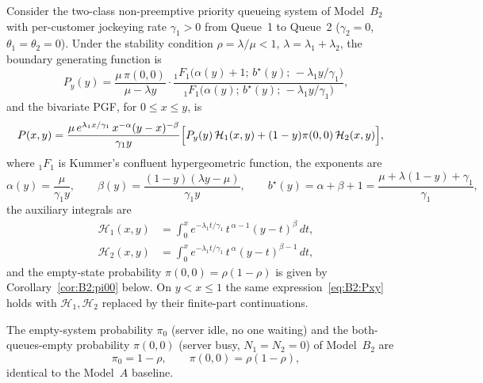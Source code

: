 \begin{theorem}\label{thm:B2}
    Consider the two-class non-preemptive priority queueing system of Model~$B_2$ with
    per-customer jockeying rate $\gamma_1>0$ from Queue~1 to Queue~2 ($\gamma_2=0$,
    $\theta_1=\theta_2=0$). Under the stability condition $\rho=\lambda/\mu<1$,
    $\lambda=\lambda_1+\lambda_2$, the boundary generating function is
    \begin{equation}
        P_y(y) = \frac{\mu\,\pi(0,0)}{\mu-\lambda y}
        \cdot\frac{{}_1F_1\!\bigl(\alpha(y)+1;\,b^\star(y);\,-\lambda_1 y/\gamma_1\bigr)}
                  {{}_1F_1\!\bigl(\alpha(y);\,b^\star(y);\,-\lambda_1 y/\gamma_1\bigr)},
        \label{eq:B2:Py_thm}
    \end{equation}
    and the bivariate PGF, for $0\le x\le y$, is
    \begin{align}
        P(x,y) &= \frac{\mu\,e^{\lambda_1 x/\gamma_1}\,x^{-\alpha}(y-x)^{-\beta}}{\gamma_1 y}
        \Bigl[P_y(y)\,\mathcal{H}_1(x,y)
              + (1-y)\pi(0,0)\,\mathcal{H}_2(x,y)\Bigr],
        \label{eq:B2:Pxy}
    \end{align}
    where ${}_1F_1$ is Kummer's confluent hypergeometric function, the exponents are
    \begin{equation}
        \alpha(y) = \frac{\mu}{\gamma_1 y}, \qquad
        \beta(y)  = \frac{(1-y)(\lambda y-\mu)}{\gamma_1 y}, \qquad
        b^\star(y) = \alpha+\beta+1 = \frac{\mu+\lambda(1-y)+\gamma_1}{\gamma_1},
        \label{eq:B2:exponents_thm}
    \end{equation}
    the auxiliary integrals are
    \begin{align}
        \mathcal{H}_1(x,y) &= \int_0^x e^{-\lambda_1 t/\gamma_1}\,t^{\,\alpha-1}(y-t)^{\beta}\,dt,
        \label{eq:B2:I1}\\
        \mathcal{H}_2(x,y) &= \int_0^x e^{-\lambda_1 t/\gamma_1}\,t^{\,\alpha}(y-t)^{\beta-1}\,dt,
        \label{eq:B2:I2}
    \end{align}
    and the empty-state probability $\pi(0,0)=\rho(1-\rho)$ is given by
    Corollary~\ref{cor:B2:pi00} below.
    On $y<x\le1$ the same expression~\eqref{eq:B2:Pxy} holds with $\mathcal{H}_1,\mathcal{H}_2$
    replaced by their finite-part continuations.
\end{theorem}

\begin{corollary}\label{cor:B2:pi00}
    The empty-system probability $\pi_0$ (server idle, no one waiting) and the
    both-queues-empty probability $\pi(0,0)$ (server busy, $N_1=N_2=0$) of Model~$B_2$ are
    \begin{equation}
        \pi_0 = 1-\rho, \qquad \pi(0,0) = \rho(1-\rho),
        \label{eq:B2:pi00}
    \end{equation}
    identical to the Model~$A$ baseline.
\end{corollary}


